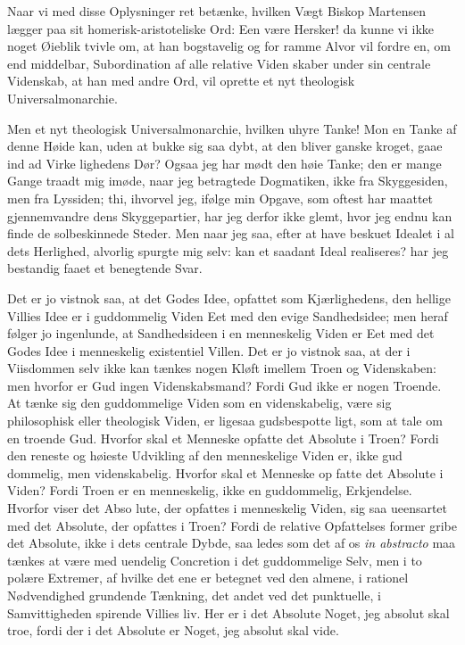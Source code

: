 \documentclass[12pt]{book}
\newcommand{\opage}[1]{\marginnote{\footnotesize\textit{[#1]}}}
\begin{document}
Naar vi med disse Oplysninger ret betænke, hvilken
Vægt Biskop Martensen lægger paa sit homerisk-aristoteliske
Ord: Een være Hersker! da kunne vi ikke noget Øieblik
tvivle om, at han bogstavelig og for ramme Alvor vil fordre
en, om end middelbar, Subordination af alle relative Viden\-%
skaber under sin centrale Videnskab, at han med andre Ord,
vil oprette et nyt theologisk Universalmonarchie.

Men et nyt theologisk Universalmonarchie, hvilken uhyre
Tanke! Mon en Tanke af denne Høide kan, uden at bukke
sig saa dybt, at den bliver ganske kroget, gaae ind ad Virke\-%
lighedens Dør? Ogsaa jeg har mødt den høie Tanke; den
er mange Gange traadt mig imøde, naar jeg betragtede
Dogmatiken, ikke fra Skyggesiden, men fra Lyssiden; thi,
ihvorvel jeg, ifølge min Opgave, som oftest har maattet
gjennemvandre dens Skyggepartier, har jeg derfor ikke glemt,
hvor jeg endnu kan finde de solbeskinnede Steder. Men naar
jeg saa, efter at have beskuet Idealet i al dets Herlighed,
alvorlig spurgte mig selv: kan et saadant Ideal realiseres?
har jeg bestandig faaet et benegtende Svar.

Det er jo vistnok saa, at det Godes Idee, opfattet som
\opage{7}\setcounter{footnote}{0}%
Kjærlighedens, den hellige Villies Idee er i guddommelig Viden
Eet med den evige Sandhedsidee; men heraf følger jo ingenlunde,
at Sandhedsideen i en menneskelig Viden er Eet med det Godes
Idee i menneskelig existentiel Villen. Det er jo vistnok
saa, at der i Viisdommen selv ikke kan tænkes nogen Kløft
imellem Troen og Videnskaben: men hvorfor er Gud ingen
Videnskabsmand? Fordi Gud ikke er nogen Troende. At
tænke sig den guddommelige Viden som en videnskabelig, være %
sig philosophisk eller theologisk Viden, er ligesaa gudsbespotte\-%
ligt, som at tale om en troende Gud. Hvorfor skal et
Menneske opfatte det Absolute i Troen? Fordi den reneste
og høieste Udvikling af den menneskelige Viden er, ikke gud\-%
dommelig, men videnskabelig. Hvorfor skal et Menneske op\-%
fatte det Absolute i Viden? Fordi Troen er en menneskelig,
ikke en guddommelig, Erkjendelse. Hvorfor viser det Abso\-%
lute, der opfattes i menneskelig Viden, sig saa ueensartet med det
Absolute, der opfattes i Troen? Fordi de relative Opfattelses\-%
former gribe det Absolute, ikke i dets centrale Dybde, saa\-%
ledes som det af os \textit{in abstracto} maa tænkes at være med
uendelig Concretion i det guddommelige Selv, men i to
polære Extremer, af hvilke det ene er betegnet ved den
almene, i rationel Nødvendighed grundende Tænkning, det
andet ved det punktuelle, i Samvittigheden spirende Villies\-%
liv. Her er i det Absolute Noget, jeg absolut skal troe,
fordi der i det Absolute er Noget, jeg absolut skal vide.
\end{document}
